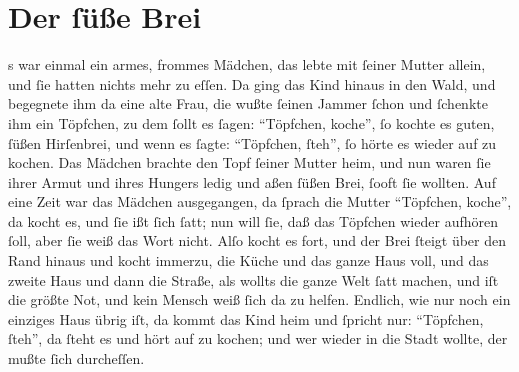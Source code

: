 \section*{Der ſüße Brei}
s war einmal ein armes, frommes Mädchen, das lebte mit ſeiner
Mutter allein, und ſie hatten nichts mehr zu eſſen.
Da ging das Kind hinaus in den Wald, und begegnete ihm da eine alte
Frau, die wußte ſeinen Jammer ſchon und ſchenkte ihm ein Töpfchen,
zu dem ſollt es ſagen:
\enquote{Töpfchen, koche}, ſo kochte es guten, ſüßen Hirſenbrei, und
wenn es ſagte: \enquote{Töpfchen, ſteh}, ſo hörte es wieder auf zu
kochen. Das Mädchen brachte den Topf ſeiner Mutter heim, und nun waren
ſie ihrer Armut und ihres Hungers ledig und aßen ſüßen Brei, ſooft
ſie wollten. Auf eine Zeit war das Mädchen ausgegangen, da ſprach die
Mutter \enquote{Töpfchen, koche}, da kocht es, und ſie ißt ſich ſatt;
nun will ſie, daß das Töpfchen wieder aufhören ſoll, aber ſie weiß das
Wort nicht. Alſo kocht es fort, und der Brei ſteigt über den Rand
hinaus und kocht immerzu, die Küche und das ganze Haus voll, und das
zweite Haus und dann die Straße, als wollts die ganze Welt ſatt machen,
und iſt die größte Not, und kein Mensch weiß ſich da zu helfen.
Endlich, wie nur noch ein einziges Haus übrig iſt, da kommt das Kind
heim und ſpricht nur: \enquote{Töpfchen, ſteh}, da ſteht es und hört
auf zu kochen; und wer wieder in die Stadt wollte, der mußte  ſich
durcheſſen.
